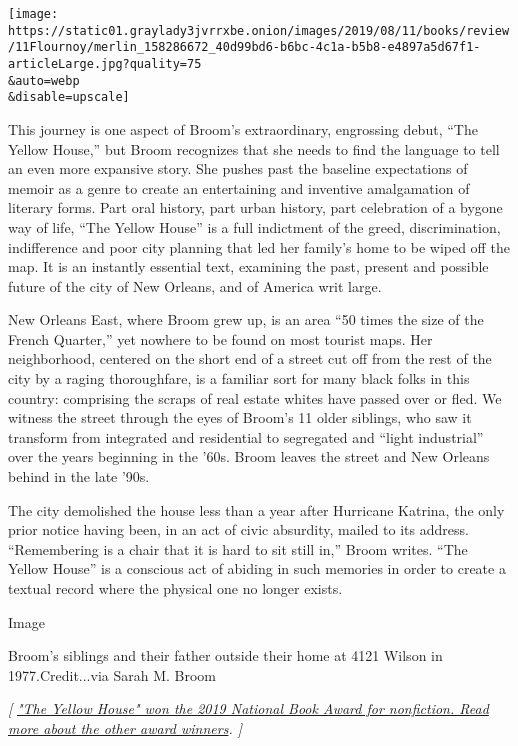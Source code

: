 \texttt{[image: https://static01.graylady3jvrrxbe.onion/images/2019/08/11/books/review/11Flournoy/merlin\_158286672\_40d99bd6-b6bc-4c1a-b5b8-e4897a5d67f1-articleLarge.jpg?quality=75\\\&auto=webp\\\&disable=upscale]}

This journey is one aspect of Broom's extraordinary, engrossing debut,
``The Yellow House,'' but Broom recognizes that she needs to find the
language to tell an even more expansive story. She pushes past the
baseline expectations of memoir as a genre to create an entertaining and
inventive amalgamation of literary forms. Part oral history, part urban
history, part celebration of a bygone way of life, ``The Yellow House''
is a full indictment of the greed, discrimination, indifference and poor
city planning that led her family's home to be wiped off the map. It is
an instantly essential text, examining the past, present and possible
future of the city of New Orleans, and of America writ large.

New Orleans East, where Broom grew up, is an area ``50 times the size of
the French Quarter,'' yet nowhere to be found on most tourist maps. Her
neighborhood, centered on the short end of a street cut off from the
rest of the city by a raging thoroughfare, is a familiar sort for many
black folks in this country: comprising the scraps of real estate whites
have passed over or fled. We witness the street through the eyes of
Broom's 11 older siblings, who saw it transform from integrated and
residential to segregated and ``light industrial'' over the years
beginning in the '60s. Broom leaves the street and New Orleans behind in
the late '90s.

The city demolished the house less than a year after Hurricane Katrina,
the only prior notice having been, in an act of civic absurdity, mailed
to its address. ``Remembering is a chair that it is hard to sit still
in,'' Broom writes. ``The Yellow House'' is a conscious act of abiding
in such memories in order to create a textual record where the physical
one no longer exists.

Image

Broom's siblings and their father outside their home at 4121 Wilson in
1977.Credit...via Sarah M. Broom

\emph{{[}}
\href{https://www.nytimes3xbfgragh.onion/2019/11/20/books/national-book-award-winners-susan-choi-sarah-broom.html}{\emph{"The
Yellow House" won the 2019 National Book Award for nonfiction. Read more
about the other award winners}}\emph{. {]}}

